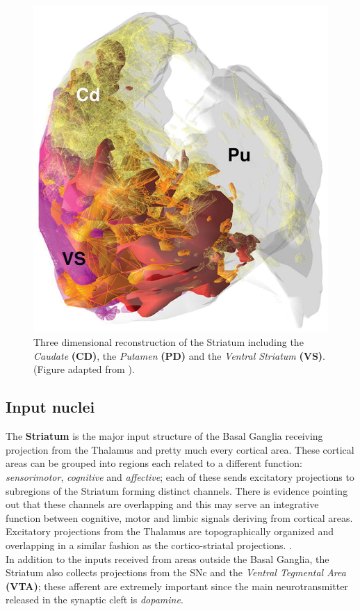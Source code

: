 \documentclass[MSc,english]{Container/thesistemplate}
\begin{document}
\begin{figure}[ht!]
  \centering
    \includegraphics[scale=.8]{Images/striatumrec.jpg}
    \caption{Three dimensional reconstruction of the Striatum including the \emph{Caudate} \textbf{(CD)}, the \emph{Putamen} \textbf{(PD)} and the \emph{Ventral Striatum} \textbf{(VS)}. (Figure adapted from \cite{striatalfigure}).}
\end{figure}

\subsection*{Input nuclei}
The \textbf{Striatum} is the major input structure of the Basal Ganglia receiving projection from the Thalamus and pretty much every cortical area. These cortical areas can be grouped into regions each related to a different function: \emph{sensorimotor}, \emph{cognitive} and \emph{affective}; each of these sends excitatory projections to subregions of the Striatum forming distinct channels. There is evidence pointing out that these channels are overlapping and this may serve an integrative function between cognitive, motor and limbic signals deriving from cortical areas. 
\\  Excitatory projections from the Thalamus are topographically organized and overlapping in a similar fashion as the cortico-striatal projections. \cite{nelsonkreitzer}.
\\ In addition to the inputs received from areas outside the Basal Ganglia, the Striatum also collects projections from the SNc and the \emph{Ventral Tegmental Area} \textbf{(VTA)}; these afferent are extremely important since the main neurotransmitter released in the synaptic cleft is \emph{dopamine}. 
\end{document}
